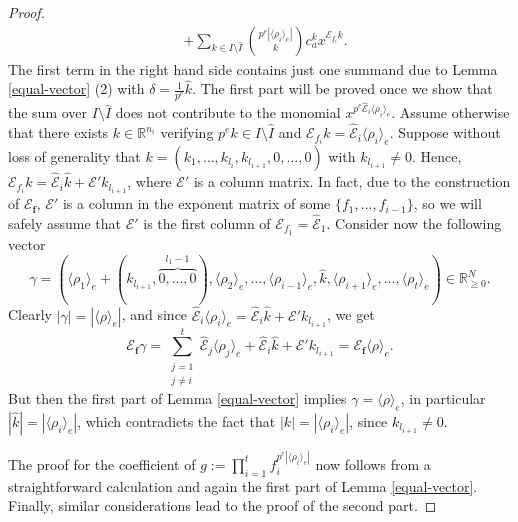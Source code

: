 \documentclass[12pt]{amsart}
\theoremstyle{definition}
\numberwithin{equation}{subsection}
\newcommand{\RR}{\mathbb{R}}
\newcommand{\Bf}{\boldsymbol{f}}
\newcommand{\E}{\mathcal{E}}
\newcommand{\tE}{\operatorname{\widehat{\E}}}
\renewcommand{\!}[1]{{\color{red}\text{\Huge$\star$ }#1}}
\begin{document}
\begin{proof}
\begin{align*}
		&+\sum_{k\in I\setminus \widehat{I}} \binom{p^{e}|\langle \rho_i \rangle_e|}{k}c_{a}^k x^{\E_{f_i} k}.
	\end{align*}
	The first term in the right hand side contains just one summand due to Lemma \ref{equal-vector} (2) with $\delta = \frac{1}{p^{e}}\hat{k}$. The first part will be proved once we show that the sum over $I\setminus \widehat{I}$ does not contribute to the monomial $x^{p^{e}\tE_i \langle \rho_i \rangle_e}$. Assume otherwise that there exists $k \in \RR^{n_i}$ verifying $p^{e}k \in I\setminus \widehat{I}$ and $\E_{f_i}k=\tE_i \langle \rho_i \rangle_e $. Suppose without loss of generality that $k=(k_1,\ldots,k_{l_i},k_{l_{i+1}},0,\ldots,0)$ with $k_{l_{i+1}}\neq 0$. Hence, $\E_{f_i}k=\tE_i \hat{k}+\E'k_{l_{i+1}}$, where $\E'$ is a column matrix. In fact, due to the construction of $\E_{\Bf}$, $\E'$ is a column in the exponent matrix of some $\{f_1,\ldots,f_{i-1}\}$, so we will safely assume that $\E'$ is the first column of $\E_{f_1}=\tE_1$. Consider now the following vector
	\[\gamma=(\langle \rho_1 \rangle_e+(k_{l_{i+1}},\overbrace{0,\ldots,0}^{l_1-1}),\langle \rho_{2} \rangle_e, \ldots, \langle \rho_{i-1}\rangle_e,\hat{k},\langle \rho_{i+1} \rangle_e,\ldots,\langle \rho_{t} \rangle_e ) \in \RR_{\geq 0}^N.
	\]
	Clearly $|\gamma|=|\langle \rho \rangle_e|$, and since $\tE_i \langle \rho_i \rangle_e =\tE_i \hat{k}+\E'k_{l_{i+1}}$, we get
	\begin{equation*}
		\E_{\Bf} \gamma =\sum_{\substack{j=1\\j\neq i}}^t \tE_j \langle \rho_j \rangle_e + \tE_i \hat{k}+\E'k_{l_{i+1}}=\E_{\Bf} \langle \rho \rangle_e.  
	\end{equation*}
	But then the first part of Lemma \ref{equal-vector} implies $\gamma= \langle \rho \rangle_e$, in particular $|\hat{k}|=|\langle \rho_i \rangle_e|$, which contradicts the fact that $|k|=|\langle \rho_i \rangle_e|$, since $k_{l_{i+1}}\neq 0$. 
	
	The proof for the coefficient of $g:=\prod_{i=1}^{t} f_i^{p^{e}|\langle \rho_i \rangle_e|}$ now follows from a straightforward calculation and again the first part of Lemma \ref{equal-vector}. Finally, similar considerations lead to the proof of the second part. 
\end{proof}
\end{document}
